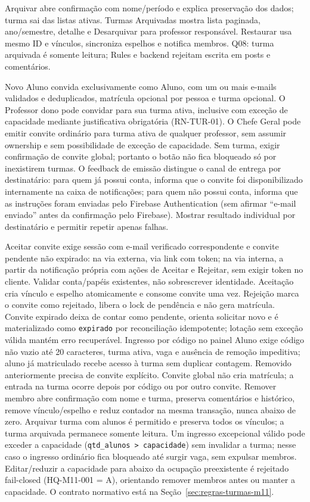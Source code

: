 Arquivar abre confirmação com nome/período e explica preservação dos dados; turma sai das listas ativas. Turmas Arquivadas mostra lista paginada, ano/semestre, detalhe e Desarquivar para professor responsável. Restaurar usa mesmo ID e vínculos, sincroniza espelhos e notifica membros. Q08: turma arquivada é somente leitura; Rules e backend rejeitam escrita em posts e comentários.

Novo Aluno convida exclusivamente como Aluno, com um ou mais e-mails validados e deduplicados, matrícula opcional por pessoa e turma opcional. O Professor dono pode convidar para sua turma ativa, inclusive com exceção de capacidade mediante justificativa obrigatória (RN-TUR-01). O Chefe Geral pode emitir convite ordinário para turma ativa de qualquer professor, sem assumir ownership e sem possibilidade de exceção de capacidade. Sem turma, exigir confirmação de convite global; portanto o botão não fica bloqueado só por inexistirem turmas. O feedback de emissão distingue o canal de entrega por destinatário: para quem já possui conta, informa que o convite foi disponibilizado internamente na caixa de notificações; para quem não possui conta, informa que as instruções foram enviadas pelo Firebase Authentication (sem afirmar ``e-mail enviado'' antes da confirmação pelo Firebase). Mostrar resultado individual por destinatário e permitir repetir apenas falhas.

Aceitar convite exige sessão com e-mail verificado correspondente e convite pendente não expirado: na via externa, via link com token; na via interna, a partir da notificação própria com ações de Aceitar e Rejeitar, sem exigir token no cliente. Validar conta/papéis existentes, não sobrescrever identidade. Aceitação cria vínculo e espelho atomicamente e consome convite uma vez. Rejeição marca o convite como rejeitado, libera o lock de pendência e não gera matrícula. Convite expirado deixa de contar como pendente, orienta solicitar novo e é materializado como \texttt{expirado} por reconciliação idempotente; lotação sem exceção válida mantém erro recuperável. Ingresso por código no painel Aluno exige código não vazio até 20 caracteres, turma ativa, vaga e ausência de remoção impeditiva; aluno já matriculado recebe acesso à turma sem duplicar contagem. Removido anteriormente precisa de convite explícito. Convite global não cria matrícula; a entrada na turma ocorre depois por código ou por outro convite. Remover membro abre confirmação com nome e turma, preserva comentários e histórico, remove vínculo/espelho e reduz contador na mesma transação, nunca abaixo de zero. Arquivar turma com alunos é permitido e preserva todos os vínculos; a turma arquivada permanece somente leitura. Um ingresso excepcional válido pode exceder a capacidade (\texttt{qtd\_alunos > capacidade}) sem invalidar a turma; nesse caso o ingresso ordinário fica bloqueado até surgir vaga, sem expulsar membros. Editar/reduzir a capacidade para abaixo da ocupação preexistente é rejeitado fail-closed (HQ-M11-001 = A), orientando remover membros antes ou manter a capacidade. O contrato normativo está na Seção~\ref{sec:regras-turmas-m11}.

